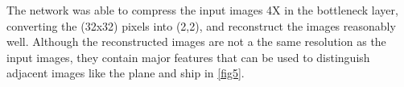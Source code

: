 \documentclass[12pt]{report}
\begin{document}
\begin{enumerate}
    The network was able to compress the input images 4X in the bottleneck layer, converting the (32x32) pixels into (2,2), and reconstruct the images reasonably well. Although the 
    reconstructed images are not a the same resolution as the input images, they contain major features that can be used to distinguish adjacent images like the plane and ship in 
    \autoref{fig5}.





\end{enumerate}
\end{document}
